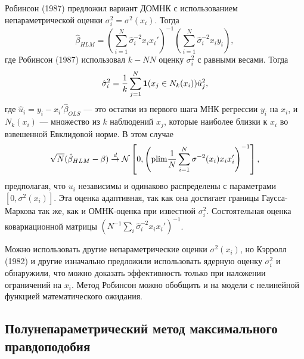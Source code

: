 Робинсон (1987) предложил вариант ДОМНК с использованием непараметрической оценки $\sigma_i^2 = \sigma^2(x_i)$. Тогда
\begin{equation}
\hat{\beta}_{HLM} = \left( \sum_{i=1}^N \hat{\sigma}_i^{-2} x_ix_i' \right)^{-1} \left( \sum_{i=1}^N \hat{\sigma}_i^{-2} x_iy_i \right),
\end{equation}
где Робинсон (1987) использовал $k - NN$ оценку $\sigma_i^2$ с равными весами. Тогда
\begin{equation}
\hat{\sigma}_i^2 = \frac{1}{k} \sum_{j=1}^N {\bf{1}} (x_j \in N_k(x_i))\hat{u}_j^2,
\end{equation}
где $\hat{u}_i = y_i - x_i'\hat{\beta}_{OLS}$ --- это остатки из первого шага МНК регрессии $y_i$ на $x_i$, и $N_k(x_i)$ --- множество из $k$ наблюдений $x_j$, которые наиболее близки к $x_i$ во взвешенной Евклидовой норме. В этом случае
\[
\sqrt{N}(\hat{\beta}_{HLM}  - \beta) \stackrel{d}{\rightarrow} \mathcal{N}\left[ 0, \left( \mathrm{plim } \frac{1}{N} \sum_{i=1}^N \sigma^{-2}(x_i)x_ix_i' \right)^{-1} \right],
\] 
предполагая, что $u_i$ независимы и одинаково распределены с параметрами $[0, \sigma^2(x_i)]$. Эта оценка адаптивная, так как она достигает границы Гаусса-Маркова так же, как и ОМНК-оценка при известной $\sigma_i^2$. Состоятельная оценка ковариационной матрицы $(N^{-1}\sum_i \hat{\sigma}_i^{-2} x_ix_i')^{-1}$.

Можно использовать другие непараметрические оценки $\sigma^2(x_i)$, но Кэрролл (1982) и другие изначально предложили использовать ядерную оценку $\sigma_i^2$ и обнаружили, что можно доказать эффективность только при  наложении ограничений на $x_i$. Метод Робинсон можно обобщить и на модели с нелинейной функцией математического ожидания.

\subsection{Полунепараметрический метод максимального правдоподобия}

